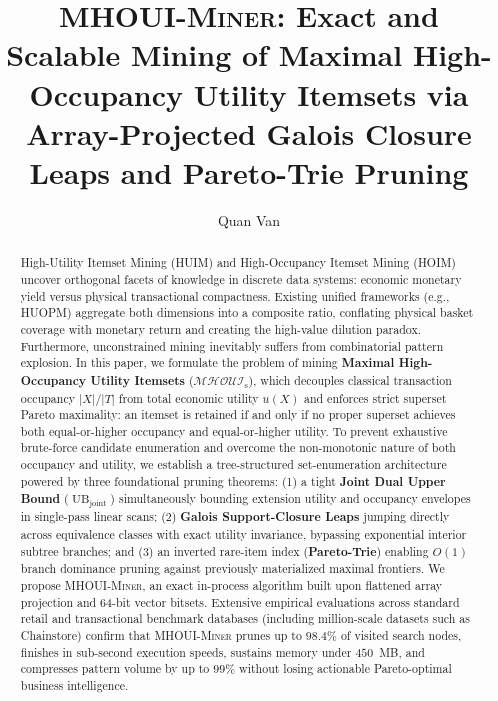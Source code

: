 \documentclass[runningheads]{llncs}
\newcommand{\MHOUI}{\ensuremath{\mathcal{MHOUI}_{\mathrm{s}}}}
\newcommand{\MHOUIminer}{\textsc{MHOUI-Miner}}
\newcommand{\UBjoint}{\operatorname{UB}_{\mathrm{joint}}}
\begin{document}
\title{\textsc{MHOUI-Miner}: Exact and Scalable Mining of Maximal High-Occupancy Utility Itemsets via Array-Projected Galois Closure Leaps and Pareto-Trie Pruning}

\author{Quan Van}

\maketitle

\begin{abstract}
High-Utility Itemset Mining (HUIM) and High-Occupancy Itemset Mining (HOIM) uncover orthogonal facets of knowledge in discrete data systems: economic monetary yield versus physical transactional compactness. Existing unified frameworks (e.g., HUOPM) aggregate both dimensions into a composite ratio, conflating physical basket coverage with monetary return and creating the high-value dilution paradox. Furthermore, unconstrained mining inevitably suffers from combinatorial pattern explosion. In this paper, we formulate the problem of mining \textbf{Maximal High-Occupancy Utility Itemsets} (\MHOUI{}), which decouples classical transaction occupancy $|X|/|T|$ from total economic utility $u(X)$ and enforces strict superset Pareto maximality: an itemset is retained if and only if no proper superset achieves both equal-or-higher occupancy and equal-or-higher utility. To prevent exhaustive brute-force candidate enumeration and overcome the non-monotonic nature of both occupancy and utility, we establish a tree-structured set-enumeration architecture powered by three foundational pruning theorems: (1) a tight \textbf{Joint Dual Upper Bound} ($\UBjoint$) simultaneously bounding extension utility and occupancy envelopes in single-pass linear scans; (2) \textbf{Galois Support-Closure Leaps} jumping directly across equivalence classes with exact utility invariance, bypassing exponential interior subtree branches; and (3) an inverted rare-item index (\textbf{Pareto-Trie}) enabling $O(1)$ branch dominance pruning against previously materialized maximal frontiers. We propose \MHOUIminer{}, an exact in-process algorithm built upon flattened array projection and 64-bit vector bitsets. Extensive empirical evaluations across standard retail and transactional benchmark databases (including million-scale datasets such as Chainstore) confirm that \MHOUIminer{} prunes up to $98.4\%$ of visited search nodes, finishes in sub-second execution speeds, sustains memory under $450$~MB, and compresses pattern volume by up to $99\%$ without losing actionable Pareto-optimal business intelligence.

\end{abstract}
\end{document}

